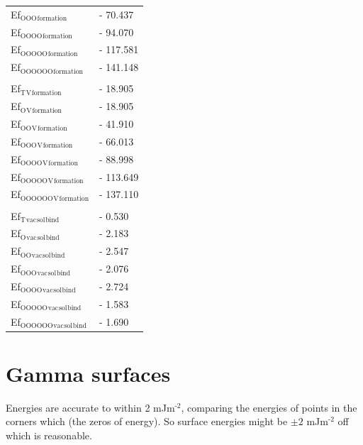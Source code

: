 \documentclass[11pt]{article}
\begin{document}
\begin{center}
\begin{tabular}{ll}
Ef\(_{\text{OOO}}\)\(_{\text{formation}}\) & -  70.437\\
Ef\(_{\text{OOOO}}\)\(_{\text{formation}}\) & -  94.070\\
Ef\(_{\text{OOOOO}}\)\(_{\text{formation}}\) & - 117.581\\
Ef\(_{\text{OOOOOO}}\)\(_{\text{formation}}\) & - 141.148\\
 & \\
Ef\(_{\text{T}}\)\(_{\text{V}}\)\(_{\text{formation}}\) & -  18.905\\
Ef\(_{\text{O}}\)\(_{\text{V}}\)\(_{\text{formation}}\) & -  18.905\\
Ef\(_{\text{OO}}\)\(_{\text{V}}\)\(_{\text{formation}}\) & -  41.910\\
Ef\(_{\text{OOO}}\)\(_{\text{V}}\)\(_{\text{formation}}\) & -  66.013\\
Ef\(_{\text{OOOO}}\)\(_{\text{V}}\)\(_{\text{formation}}\) & -  88.998\\
Ef\(_{\text{OOOOO}}\)\(_{\text{V}}\)\(_{\text{formation}}\) & - 113.649\\
Ef\(_{\text{OOOOOO}}\)\(_{\text{V}}\)\(_{\text{formation}}\) & - 137.110\\
 & \\
Ef\(_{\text{T}}\)\(_{\text{vac}}\)\(_{\text{sol}}\)\(_{\text{bind}}\) & -   0.530\\
Ef\(_{\text{O}}\)\(_{\text{vac}}\)\(_{\text{sol}}\)\(_{\text{bind}}\) & -   2.183\\
Ef\(_{\text{OO}}\)\(_{\text{vac}}\)\(_{\text{sol}}\)\(_{\text{bind}}\) & -   2.547\\
Ef\(_{\text{OOO}}\)\(_{\text{vac}}\)\(_{\text{sol}}\)\(_{\text{bind}}\) & -   2.076\\
Ef\(_{\text{OOOO}}\)\(_{\text{vac}}\)\(_{\text{sol}}\)\(_{\text{bind}}\) & -  2.724\\
Ef\(_{\text{OOOOO}}\)\(_{\text{vac}}\)\(_{\text{sol}}\)\(_{\text{bind}}\) & - 1.583\\
Ef\(_{\text{OOOOOO}}\)\(_{\text{vac}}\)\(_{\text{sol}}\)\(_{\text{bind}}\) & - 1.690\\
\end{tabular}
\end{center}

\section{Gamma surfaces}
\label{sec:org4778949}

Energies are accurate to within 2 mJm\(^{\text{-2}}\), comparing the energies of
points in the corners which (the zeros of energy). So surface energies
might be \(\pm 2\) mJm\(^{\text{-2}}\) off which is reasonable. 
\end{document}
